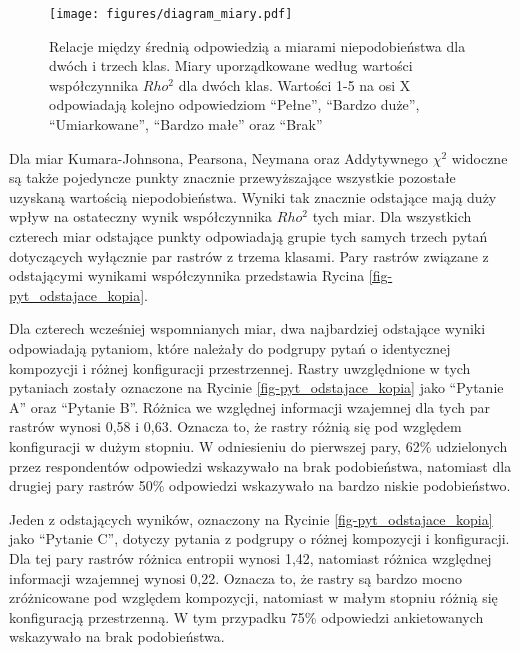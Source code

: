 \documentclass{amuthesis}
\begin{document}
\begin{figure}[t]

{\centering \texttt{[image: figures/diagram\_miary.pdf]}

}

\caption{\label{fig-avg_vs_measures}Relacje między średnią odpowiedzią a
miarami niepodobieństwa dla dwóch i trzech klas. Miary uporządkowane
według wartości współczynnika \(Rho^2\) dla dwóch klas. Wartości 1-5 na
osi X odpowiadają kolejno odpowiedziom ``Pełne'', ``Bardzo duże'',
``Umiarkowane'', ``Bardzo małe'' oraz ``Brak''}

\end{figure}

Dla miar Kumara-Johnsona, Pearsona, Neymana oraz Addytywnego \(\chi^2\)
widoczne są także pojedyncze punkty znacznie przewyższające wszystkie
pozostałe uzyskaną wartością niepodobieństwa. Wyniki tak znacznie
odstające mają duży wpływ na ostateczny wynik współczynnika \(Rho^2\)
tych miar. Dla wszystkich czterech miar odstające punkty odpowiadają
grupie tych samych trzech pytań dotyczących wyłącznie par rastrów z
trzema klasami. Pary rastrów związane z odstającymi wynikami
współczynnika przedstawia Rycina \ref{fig-pyt_odstajace_kopia}.

Dla czterech wcześniej wspomnianych miar, dwa najbardziej odstające
wyniki odpowiadają pytaniom, które należały do podgrupy pytań o
identycznej kompozycji i różnej konfiguracji przestrzennej. Rastry
uwzględnione w tych pytaniach zostały oznaczone na Rycinie
\ref{fig-pyt_odstajace_kopia} jako ``Pytanie A'' oraz ``Pytanie B''.
Różnica we względnej informacji wzajemnej dla tych par rastrów wynosi
0,58 i 0,63. Oznacza to, że rastry różnią się pod względem konfiguracji
w dużym stopniu. W odniesieniu do pierwszej pary, 62\% udzielonych przez
respondentów odpowiedzi wskazywało na brak podobieństwa, natomiast dla
drugiej pary rastrów 50\% odpowiedzi wskazywało na bardzo niskie
podobieństwo.

Jeden z odstających wyników, oznaczony na Rycinie
\ref{fig-pyt_odstajace_kopia} jako ``Pytanie C'', dotyczy pytania z
podgrupy o różnej kompozycji i konfiguracji. Dla tej pary rastrów
różnica entropii wynosi 1,42, natomiast różnica względnej informacji
wzajemnej wynosi 0,22. Oznacza to, że rastry są bardzo mocno
zróżnicowane pod względem kompozycji, natomiast w małym stopniu różnią
się konfiguracją przestrzenną. W tym przypadku 75\% odpowiedzi
ankietowanych wskazywało na brak podobieństwa.
\end{document}
